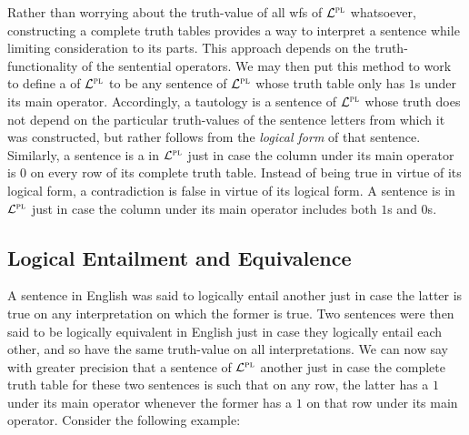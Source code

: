 Rather than worrying about the truth-value of all wfs of $\mathcal{L}^{\textsc{pl}}$ whatsoever, constructing a complete truth tables provides a way to interpret a sentence while limiting consideration to its parts.
This approach depends on the truth-functionality of the sentential operators.
We may then put this method to work to define a  of $\mathcal{L}^{\textsc{pl}}$ to be any sentence of $\mathcal{L}^{\textsc{pl}}$ whose truth table only has $1$s under its main operator.
Accordingly, a tautology is a sentence of $\mathcal{L}^{\textsc{pl}}$ whose truth does not depend on the particular truth-values of the sentence letters from which it was constructed, but rather follows from the \textit{logical form} of that sentence.
Similarly, a sentence is a  in $\mathcal{L}^{\textsc{pl}}$ just in case the column under its main operator is $0$ on every row of its complete truth table.
Instead of being true in virtue of its logical form, a contradiction is false in virtue of its logical form.
A sentence is  in $\mathcal{L}^{\textsc{pl}}$ just in case the column under its main operator includes both $1$s and $0$s. %



\subsection{Logical Entailment and Equivalence}

A sentence in English was said to logically entail another just in case the latter is true on any interpretation on which the former is true.
Two sentences were then said to be logically equivalent in English just in case they logically entail each other, and so have the same truth-value on all interpretations.
We can now say with greater precision that a sentence of $\mathcal{L}^{\textsc{pl}}$  another just in case the complete truth table for these two sentences is such that on any row, the latter has a $1$ under its main operator whenever the former has a $1$ on that row under its main operator. 
Consider the following example:

